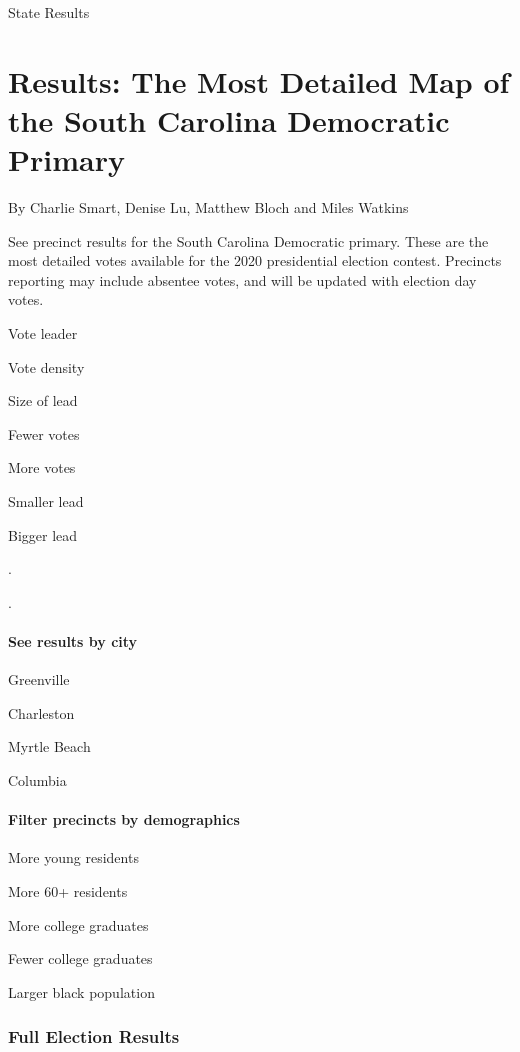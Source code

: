  State Results

\hypertarget{results-the-most-detailed-map-of-the-south-carolina-democratic-primary-1}{%
\section{Results: The Most Detailed Map of the South Carolina Democratic
Primary}\label{results-the-most-detailed-map-of-the-south-carolina-democratic-primary-1}}

By Charlie Smart, Denise Lu, Matthew Bloch and Miles Watkins

See precinct results for the South Carolina Democratic primary. These
are the most detailed votes available for the 2020 presidential election
contest. Precincts reporting may include absentee votes, and will be
updated with election day votes.

Vote leader

Vote density

Size of lead

Fewer votes

More votes

Smaller lead

Bigger lead

.

.

\hypertarget{see-results-by-city}{%
\paragraph{See results by city}\label{see-results-by-city}}

Greenville

Charleston

Myrtle Beach

Columbia

\hypertarget{filter-precincts-by-demographics}{%
\paragraph{Filter precincts by
demographics}\label{filter-precincts-by-demographics}}

More young residents

More 60+ residents

More college graduates

Fewer college graduates

Larger black population

\hypertarget{full-election-results}{%
\subsubsection{Full Election Results}\label{full-election-results}}

